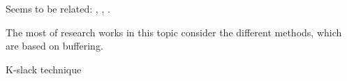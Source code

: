 
\label {fs-related}

Seems to be related: \cite{4279071}, \cite{Wei:2009:SSO:1559845.1559973}, \cite{Mutschler:2014:ASP:2659232.2633686}.

The most of research works in this topic consider the different methods, which are based on buffering.

K-slack technique 